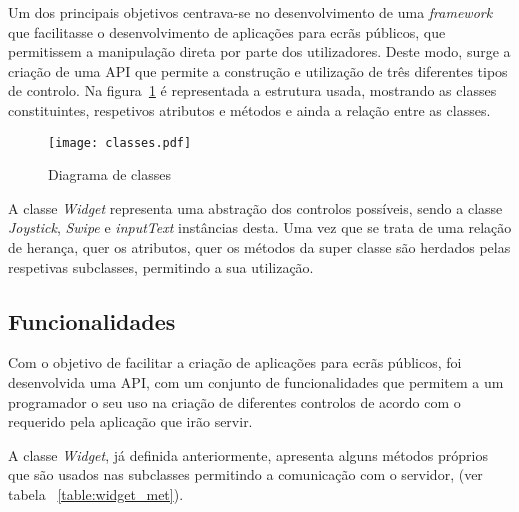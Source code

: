 Um dos principais objetivos centrava-se no desenvolvimento de uma \textit{framework} que facilitasse o desenvolvimento de aplicações para ecrãs públicos, que permitissem a manipulação direta por parte dos utilizadores. Deste modo, surge a criação de uma API que permite a construção e utilização de três diferentes tipos de controlo. 
Na figura~\ref{fig:classes} é representada a estrutura usada, mostrando as classes constituintes, respetivos atributos e métodos e ainda a relação entre as classes.

\begin{figure}[ht]
\centering
\texttt{[image: classes.pdf]}
\caption[Diagrama de Classes] {Diagrama de classes}
\label{fig:classes}
\end{figure}

A classe \textit{Widget} representa uma abstração dos controlos possíveis, sendo a classe \textit{Joystick}, \textit{Swipe} e \textit{inputText} instâncias desta. Uma vez que se trata de uma relação de herança, quer os atributos, quer os métodos da super classe são herdados pelas respetivas subclasses, permitindo a sua utilização.

\subsection{Funcionalidades}

	Com o objetivo de facilitar a criação de aplicações para ecrãs públicos, foi desenvolvida uma API, com um conjunto de funcionalidades que permitem a um programador o seu uso na criação de diferentes controlos de acordo com o requerido pela aplicação que irão servir.

	A classe \textit{Widget}, já definida anteriormente, apresenta alguns métodos próprios que são usados nas subclasses permitindo a comunicação com o servidor, (ver tabela ~\ref{table:widget_met}).

